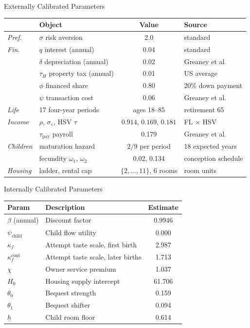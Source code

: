 \documentclass[11pt,aspectratio=169]{beamer}
\begin{document}
\begin{frame}{Externally Calibrated Parameters}
\small
\centering
\renewcommand{\arraystretch}{0.95}
\begin{tabular}{llcl}
\toprule
& \textbf{Object} & \textbf{Value} & \textbf{Source} \\
\midrule
\textit{Pref.} & $\sigma$ risk aversion & 2.0 & standard \\
\textit{Fin.} & $q$ interest (annual) & 0.04 & standard \\
& $\delta$ depreciation (annual) & 0.02 & Greaney et al. \\
& $\tau_H$ property tax (annual) & 0.01 & US average \\
& $\phi$ financed share & 0.80 & 20\% down payment \\
& $\psi$ transaction cost & 0.06 & Greaney et al. \\
\textit{Life} & 17 four-year periods & ages 18--85 & retirement 65 \\
\textit{Income} & $\rho$, $\sigma_\varepsilon$, HSV $\tau$ & $0.914$, $0.169$, $0.181$ & FL $\times$ HSV \\
& $\tau_{\mathrm{pay}}$ payroll & 0.179 & Greaney et al. \\
\textit{Children} & maturation hazard & $2/9$ per period & 18 expected years \\
& fecundity $\omega_1$, $\omega_2$ & 0.02, 0.134 & conception schedule \\
\textit{Housing} & ladder, rental cap & $\{2,\dots,11\}$, $6$ rooms & room units \\
\bottomrule
\end{tabular}
\end{frame}

\begin{frame}{Internally Calibrated Parameters}
\centering
\renewcommand{\arraystretch}{0.95}
\begin{tabular}{llc}
\toprule
\textbf{Param} & \textbf{Description} & \textbf{Estimate} \\
\midrule
$\beta$ (annual) & Discount factor & 0.9946 \\
$\psi_{\mathrm{child}}$ & Child flow utility & 0.000 \\
$\kappa_f$ & Attempt taste scale, first birth & 2.987 \\
$\kappa_f^{\mathrm{cont}}$ & Attempt taste scale, later births & 1.713 \\
$\chi$ & Owner service premium & 1.037 \\
$H_0$ & Housing supply intercept & 61.706 \\
$\theta_0$ & Bequest strength & 0.159 \\
$\theta_1$ & Bequest shifter & 0.094 \\
$\underline h$ & Child room floor & 0.614 \\
\bottomrule
\end{tabular}
\end{frame}
\end{document}
